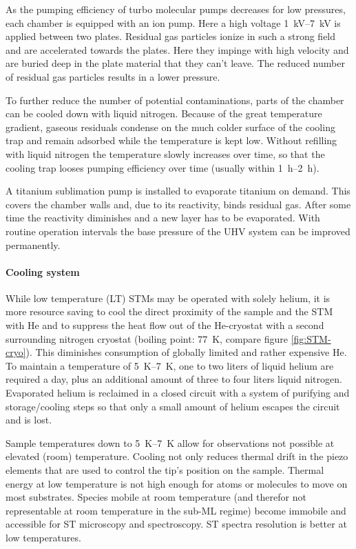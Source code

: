 As the pumping efficiency of turbo molecular pumps decreases for low pressures, each chamber is equipped with an ion pump. Here a high voltage \SIrange{1}{7}{\kilo \volt} is applied between two plates. Residual gas particles ionize in such a strong field and are accelerated towards the plates. Here they impinge with high velocity and are buried deep in the plate material that they can't leave. The reduced number of residual gas particles results in a lower pressure.

To further reduce the number of potential contaminations, parts of the chamber can be cooled down with liquid nitrogen. Because of the great temperature gradient, gaseous residuals condense on the much colder surface of the cooling trap and remain adsorbed while the temperature is kept low. Without refilling with liquid nitrogen the temperature slowly increases over time, so that the cooling trap looses pumping efficiency over time (usually within \SIrange{1}{2}{\hour}).

A titanium sublimation pump is installed to evaporate titanium on demand. This covers the chamber walls and, due to its reactivity, binds residual gas. After some time the reactivity diminishes and a new layer has to be evaporated. With routine operation intervals the base pressure of the UHV system can be improved permanently.

\paragraph{Cooling system} 
While low temperature (LT) STMs may be operated with solely helium, it is more resource saving to cool the direct proximity of the sample and the STM with He and to suppress the heat flow out of the He-cryostat with a second surrounding nitrogen cryostat (boiling point: \SI{77}{\K}, compare figure \ref{fig:STM-cryo}). This diminishes consumption of globally limited and rather expensive He. To maintain a temperature of \SIrange{5}{7}{\K}, one to two liters of liquid helium are required a day, plus an additional amount of three to four liters liquid nitrogen. Evaporated helium is reclaimed in a closed circuit with a system of purifying and storage/cooling steps so that only a small amount of helium escapes the circuit and is lost.

Sample temperatures down to \SIrange{5}{7}{\K} allow for observations not possible at elevated (room) temperature. Cooling not only reduces thermal drift in the piezo elements that are used to control the tip's position on the sample. Thermal energy at low temperature is not high enough for atoms or molecules to move on most substrates. Species mobile at room temperature (and therefor not representable at room temperature in the sub-ML regime) become immobile and accessible for ST microscopy and spectroscopy. ST spectra resolution is better at low temperatures.

